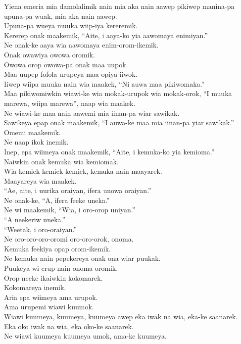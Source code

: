 Yiena emeria mia damolalimik nain mia aka nain aawep pikiwep manina-pa upuna-pa wuak, mia aka nain aawep. \\
Upuna-pa wueya muuka wiip-iya kereremik. \\
Kererep onak maakemik, “Aite, i aaya-ko yia aawomaya enimiyan.” \\
Ne onak-ke aaya wia aawomaya enim-orom-ikemik. \\
Onak owawiya owowa oromik. \\
Owowa orop owowa-pa onak maa uupok. \\
Maa uupep fofola urupeya maa opiya iiwok. \\
Iiwep wiipa muuka nain wia maakek, “Ni auwa maa pikiwomaka.” \\
Maa pikiwomiwkin wiawi-ke wia mokak-urupok wia mokak-orok,  “I muuka marewa, wiipa marewa”, naap wia maakek. \\
Ne wiawi-ke maa nain aawemi mia iinan-pa wiar sawikak. \\
Sawikeya epap onak maakemik, “I auwa-ke maa mia iinan-pa yiar sawikak.” \\
Omemi maakemik. \\
Ne naap ikok inemik. \\
Inep, epa wiimeya onak maakemik, “Aite, i kemuka-ko yia kemioma.” \\
Naiwkin onak kemuka wia kemiomak. \\
Wia kemiek kemiek kemiek, kemuka nain maayarek. \\
Maayareya wia maakek. \\
“Ae, aite, i uurika oraiyan, ifera unowa oraiyan.” \\
Ne onak-ke, “A, ifera feeke uneka.” \\
Ne wi maakemik, “Wia, i oro-orop uniyan.” \\
“A neekeriw uneka.” \\
“Weetak, i oro-oraiyan.” \\
Ne oro-oro-oro-oromi oro-oro-orok, onoma. \\
Kemuka feekiya opap orom-ikemik. \\
Ne kemuka nain pepekereya onak ona wiar puukak. \\
Puukeya wi erup nain onoma oromik. \\
Orop neeke ikaiwkin kokomarek. \\
Kokomareya inemik. \\
Aria epa wiimeya ama urupok. \\
Ama urupemi wiawi kuumok. \\
Wiawi kuumeya, kuumeya, kuumeya awep eka iwak na wia, eka-ke saanarek. \\
Eka oko iwak na wia, eka oko-ke saanarek. \\
Ne wiawi kuumeya kuumeya umok, ama-ke kuumeya. \\
\setcounter{equation}{0}
